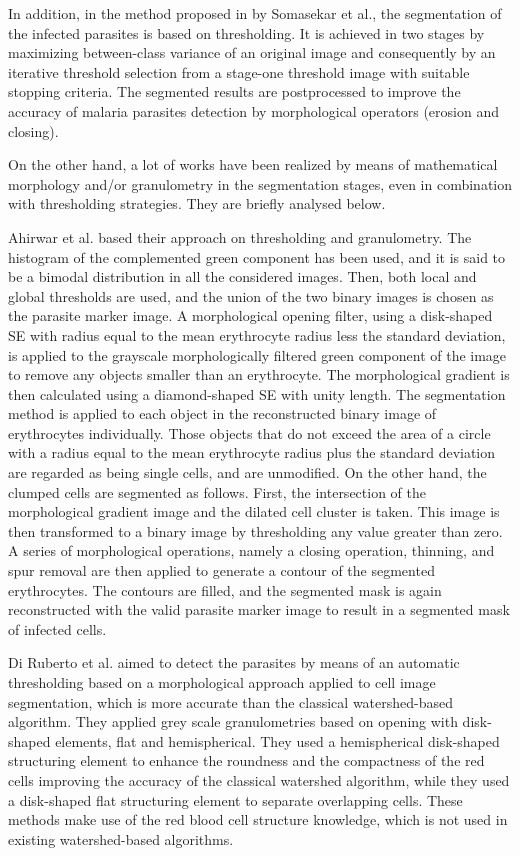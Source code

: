 \documentclass[final,a4paper,12pt,english]{UnicaPhdThesis3}
\begin{document}
In addition, in the method proposed in \cite{Somasekar2017} by Somasekar et al., the segmentation of the infected parasites is based on thresholding. It is achieved in two stages by maximizing between-class variance of an original image and consequently by an iterative threshold selection from a stage-one threshold image with suitable stopping criteria. The segmented results are postprocessed to improve the accuracy of malaria parasites detection by morphological operators (erosion and closing).

On the other hand, a lot of works have been realized by means of mathematical morphology and/or granulometry in the segmentation stages, even in combination with thresholding strategies. They are briefly analysed below.

Ahirwar et al. \cite{Ahirwar2012} based their approach on thresholding and granulometry. The histogram of the complemented green component has been used, and it is said to be a bimodal distribution in all the considered images. Then, both local and global thresholds are used, and the union of the two binary images is chosen as the parasite marker image. A morphological opening filter, using a disk-shaped SE with radius equal to the mean erythrocyte radius less the standard deviation, is applied to the grayscale morphologically filtered green component of the image to remove any objects smaller than an erythrocyte. The morphological gradient is then calculated using a diamond-shaped SE with unity length. The segmentation method is applied to each object in the reconstructed binary image of erythrocytes individually. Those objects that do not exceed the area of a circle with a radius equal to the mean erythrocyte radius plus the standard deviation are regarded as being single cells, and are unmodified. On the other hand, the clumped cells are segmented as follows. First, the intersection of the morphological gradient image and the dilated cell cluster is taken. This image is then transformed to a binary image by thresholding any value greater than zero. A series of morphological operations, namely a closing operation, thinning, and spur removal are then applied to generate a contour of the segmented erythrocytes. The contours are filled, and the segmented mask is again reconstructed with the valid parasite marker image to result in a segmented mask of infected cells.

Di Ruberto et al. \cite{DiRuberto2002} aimed to detect the parasites by means of an automatic thresholding based on a morphological approach applied to cell image segmentation, which is more accurate than the classical watershed-based algorithm. They applied grey scale granulometries based on opening with disk-shaped elements, flat and hemispherical. They used a hemispherical disk-shaped structuring element to enhance the roundness and the compactness of the red cells improving the accuracy of the classical watershed algorithm, while they used a disk-shaped flat structuring element to separate overlapping cells. These methods make use of the red blood cell structure knowledge, which is not used in existing watershed-based algorithms.
\end{document}
